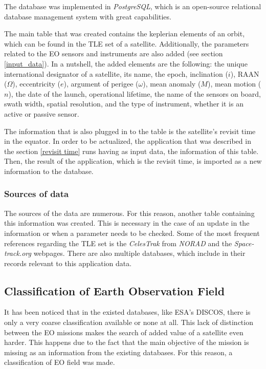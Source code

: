 \bigskip
The database was implemented in \textit{PostgreSQL}, which is an open-source relational database management system with great capabilities.  

The main table that was created contains the keplerian elements of an orbit, which can be found in the TLE set of a satellite. Additionally, the parameters related to the EO sensors and instruments are also added (see section \ref{input_data}). In a nutshell, the added elements are the following: the unique international designator of a satellite, its name, the epoch, inclination ($i$), RAAN ($\Omega$), eccentricity ($e$), argument of perigee ($\omega$), mean anomaly ($M$), mean motion ($n$), the date of the launch, operational lifetime, the name of the sensors on board, swath width, spatial resolution, and the type of instrument, whether it is an active or passive sensor.

The information that is also plugged in to the table is the satellite's revisit time in the equator. In order to be actualized, the application that was described in the section \ref{revisit time} runs having as input data, the information of this table. Then, the result of the application, which is the revisit time, is imported as a new information to the database.

\bigskip
\subsubsection{Sources of data}
\bigskip

The sources of the data are numerous. For this reason, another table containing this information was created. This is necessary in the case of an update in the information or when a parameter needs to be checked. Some of the most frequent references regarding the TLE set is the \textit{CelesTrak} from \textit{NORAD} and the \textit{Space-track.org} webpages. There are also multiple databases, which include in their records relevant to this application data.

\bigskip
\subsection{Classification of Earth Observation Field}
\bigskip

It has been noticed that in the existed databases, like ESA's DISCOS, there is only a very coarse classification available or none at all. This lack of distinction between the EO missions makes the search of added value of a satellite even harder. This happens due to the fact that the main objective of the mission is missing as an information from the existing databases. For this reason, a classification of EO field was made.


